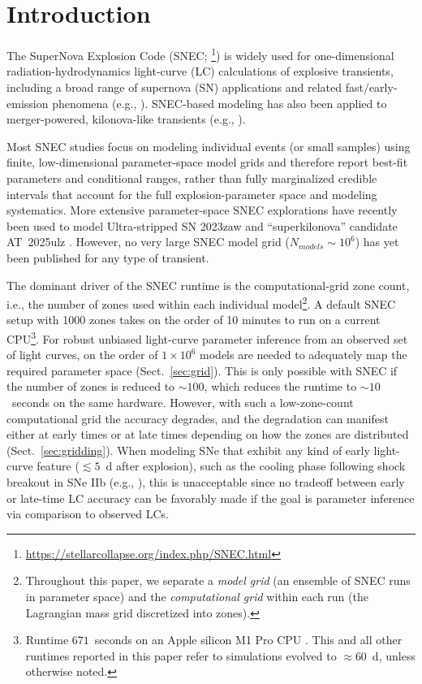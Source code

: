 \documentclass[twocolumn,linenumbers]{aastex701}
\begin{document}

\section{Introduction}
The SuperNova Explosion Code (SNEC; \citealp{Morozova2015}\footnote{\url{https://stellarcollapse.org/index.php/SNEC.html}}) is widely used for one-dimensional radiation-hydrodynamics light-curve (LC) calculations of explosive transients, including a broad range of supernova (SN) applications and related fast/early-emission phenomena (e.g., \citealp{Morozova2016,Morozova2017,Piro2017,Morozova2018,Reguitti2024,Martas2025}). SNEC-based modeling has also been applied to merger-powered, kilonova-like transients (e.g., \citealp{Wu2022,Curtis2023}).

Most SNEC studies focus on modeling individual events (or small samples) using finite, low-dimensional parameter-space model grids and therefore report best-fit parameters and conditional ranges, rather than fully marginalized credible intervals that account for the full explosion-parameter space and modeling systematics. More extensive parameter-space SNEC explorations have recently been used to model Ultra-stripped SN 2023zaw \citep{Das2024} and ``superkilonova'' candidate AT~2025ulz \citep{Kasliwal2025}. However, no very large SNEC model grid ($N_{models}\sim10^6$) has yet been published for any type of transient.

The dominant driver of the SNEC runtime is the computational-grid zone count, i.e., the number of zones used within each individual model\footnote{Throughout this paper, we separate a \emph{model grid} (an ensemble of SNEC runs in parameter space) and the \emph{computational grid} within each run (the Lagrangian mass grid discretized into zones).}. A default SNEC setup with 1000 zones takes on the order of 10 minutes to run on a current CPU\footnote{Runtime $671$~seconds on an Apple silicon M1 Pro CPU . This and all other runtimes reported in this paper refer to simulations evolved to $\approx60$~d, unless otherwise noted.}. For robust unbiased light-curve parameter inference from an observed set of light curves, on the order of $1\times10^6$ models are needed to adequately map the required parameter space (Sect.~\ref{sec:grid}). This is only possible with SNEC  if the number of zones is reduced to $\sim100$, which reduces the runtime to $\sim10$~seconds on the same hardware. However, with such a low-zone-count computational grid the accuracy degrades, and the degradation can manifest either at early times or at late times depending on how the zones are distributed (Sect.~\ref{sec:gridding}). When modeling SNe that exhibit any kind of early light-curve feature ($\lesssim5$~d after explosion), such as the cooling phase following shock breakout in SNe IIb (e.g., \citealp{NakarPiro2014,Piro2015}), this is unacceptable since no tradeoff between early or late-time LC accuracy can be favorably made if the goal is parameter inference via comparison to observed LCs.
\end{document}
